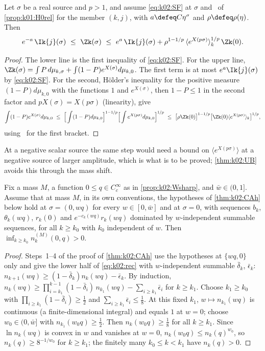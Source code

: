\begin{lemma}\label{lem:k02:HLF}
Let $\sigma$ be a real source and $p>1$, and assume \eqref{eq:k02:SF} at $\sigma$ and \Rzero\ of \cref{prop:k01:H0rel} for the member $(k,j)$, with $a\defeq C\eta^\sigma$ and $\rho\defeq\rho(\eta)$. Then
\[
e^{-a}\,\Ik{j}(\sigma)\ \le\ \Zk(\sigma)\ \le\ e^{a}\,\Ik{j}(\sigma)+\rho^{1-1/p}\,\langle e^{X(p\sigma)}\rangle_k^{1/p}\,\Zk(0).
\]
\end{lemma}
\begin{proof}
The lower line is the first inequality of \eqref{eq:k02:SF}. For the upper line, $\Zk(\sigma)=\int P\,d\mu_{k,\sigma}+\int(1-P)e^{X(\sigma)}d\mu_{k,0}$. The first term is at most $e^{a}\Ik{j}(\sigma)$ by \eqref{eq:k02:SF}. For the second, Hölder's inequality for the positive measure $(1-P)d\mu_{k,0}$ with the functions $1$ and $e^{X(\sigma)}$, then $1-P\le1$ in the second factor and $pX(\sigma)=X(p\sigma)$ (linearity), give
\[
\int(1-P)e^{X(\sigma)}d\mu_{k,0}\ \le\ \Big[\int(1-P)d\mu_{k,0}\Big]^{1-1/p}\Big[\int e^{X(p\sigma)}d\mu_{k,0}\Big]^{1/p}\ \le\ \big[\rho\Zk(0)\big]^{1-1/p}\big[\Zk(0)\langle e^{X(p\sigma)}\rangle_k\big]^{1/p},
\]
using \Rzero\ for the first bracket.
\end{proof}
At a negative scalar source the same step would need a bound on $\langle e^{X(p\sigma)}\rangle$ at a negative source of larger amplitude, which is what is to be proved; \cref{thm:k02:UB} avoids this through the mass shift.

\begin{lemma}\label{lem:k02:POS}
Fix a mass $M$, a function $0\le q\in C^\infty_c$ as in \cref{prop:k02:Wsharp}, and $\bar w\in(0,1]$. Assume that at mass $M$, in its own conventions, the hypotheses of \cref{thm:k02:CAh} below hold at $\sigma=(0,wq)$ for every $w\in[0,\bar w]$ and at $\sigma=0$, with sequences $b_k$, $\theta_k(wq)$, $r_k(0)$ and $e^{-c_k(wq)}r_k(wq)$ dominated by $w$-independent summable sequences, for all $k\ge k_0$ with $k_0$ independent of $w$. Then $\inf_{k\ge k_0}n^{(M)}_k(0,q)>0$.
\end{lemma}
\begin{proof}
Steps~1--4 of the proof of \cref{thm:k02:CAh} use the hypotheses at $\{wq,0\}$ only and give the lower half of \eqref{eq:k02:rec} with $w$-independent summable $\bar\delta_k$, $\bar\epsilon_k$: $n_{k+1}(wq)\ge(1-\bar\delta_k)n_k(wq)-\bar\epsilon_k$. By induction, $n_k(wq)\ge\prod_{i=k_1}^{k-1}(1-\bar\delta_i)\,n_{k_1}(wq)-\sum_{i\ge k_1}\bar\epsilon_i$ for $k\ge k_1$. Choose $k_1\ge k_0$ with $\prod_{i\ge k_1}(1-\bar\delta_i)\ge\frac12$ and $\sum_{i\ge k_1}\bar\epsilon_i\le\frac18$. At this fixed $k_1$, $w\mapsto n_{k_1}(wq)$ is continuous (a finite-dimensional integral) and equals $1$ at $w=0$; choose $w_0\in(0,\bar w]$ with $n_{k_1}(w_0q)\ge\frac12$. Then $n_k(w_0q)\ge\frac18$ for all $k\ge k_1$. Since $\ln n_k(wq)$ is convex in $w$ and vanishes at $w=0$, $n_k(w_0q)\le n_k(q)^{w_0}$, so $n_k(q)\ge8^{-1/w_0}$ for $k\ge k_1$; the finitely many $k_0\le k<k_1$ have $n_k(q)>0$.
\end{proof}
